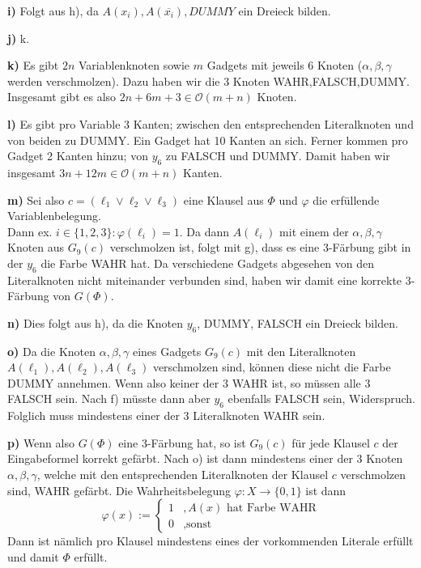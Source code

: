 \documentclass[a4paper,graphics,11pt]{article}
\begin{document}
\textbf{i)}
Folgt aus h), da $A(x_i), A(\overline{x_i}), DUMMY$ ein Dreieck bilden.

\textbf{j)} k.

\textbf{k)}
Es gibt $2n$ Variablenknoten sowie $m$ Gadgets mit jeweils 6 Knoten ($\alpha,\beta,\gamma$ werden verschmolzen).
Dazu haben wir die 3 Knoten WAHR,FALSCH,DUMMY.
Insgesamt gibt es also $2n+6m+3 \in \mathcal{O}(m+n)$ Knoten.

\textbf{l)}
Es gibt pro Variable 3 Kanten; zwischen den entsprechenden Literalknoten und von beiden zu DUMMY. Ein Gadget hat 10 Kanten
an sich. Ferner kommen pro Gadget 2 Kanten hinzu; von $y_6$ zu FALSCH und DUMMY.
Damit haben wir insgesamt $3n+12m \in \mathcal{O}(m+n)$ Kanten.

\textbf{m)}
Sei also $c = (\ell_1 \lor \ell_2 \lor \ell_3)$ eine Klausel aus $\Phi$ und $\varphi$ die erfüllende Variablenbelegung.\\
Dann ex. $i \in \{1,2,3\}: \varphi(\ell_i) = 1$. Da dann $A(\ell_i)$ mit einem der $\alpha,\beta,\gamma$ Knoten aus $G_9(c)$
verschmolzen ist, folgt mit g), dass es eine 3-Färbung gibt in der $y_6$ die Farbe WAHR hat.
Da verschiedene Gadgets abgesehen von den Literalknoten nicht miteinander verbunden sind, haben wir damit
eine korrekte 3-Färbung von $G(\Phi)$.

\textbf{n)}
Dies folgt aus h), da die Knoten $y_6$, DUMMY, FALSCH ein Dreieck bilden.

\textbf{o)}
Da die Knoten $\alpha,\beta,\gamma$ eines Gadgets $G_9(c)$ mit den Literalknoten $A(\ell_1),A(\ell_2),A(\ell_3)$ verschmolzen
sind, können diese nicht die Farbe DUMMY annehmen. Wenn also keiner der 3 WAHR ist, so müssen alle 3 FALSCH sein.
Nach f) müsste dann aber $y_6$ ebenfalls FALSCH sein, Widerspruch. Folglich muss mindestens einer der 3 Literalknoten WAHR sein.

\textbf{p)}
Wenn also $G(\Phi)$ eine 3-Färbung hat, so ist $G_9(c)$ für jede Klausel $c$ der Eingabeformel korrekt gefärbt.
Nach o) ist dann mindestens einer der 3 Knoten $\alpha,\beta,\gamma$, welche mit den entsprechenden Literalknoten der Klausel $c$
verschmolzen sind, WAHR gefärbt. Die Wahrheitsbelegung $\varphi : X \to \{0,1\}$ ist dann
$$
    \varphi(x) := \begin{cases}
        1 &, A(x) \text{ hat Farbe WAHR}\\
        0 &,\text{sonst}
    \end{cases}
$$
Dann ist nämlich pro Klausel mindestens eines der vorkommenden Literale erfüllt und damit $\Phi$ erfüllt.
\end{document}
